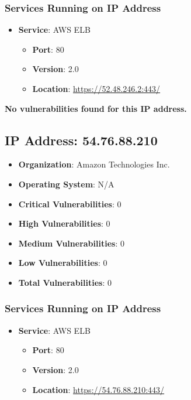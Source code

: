 \documentclass{article}
\begin{document}
\subsubsection*{Services Running on IP Address}

\begin{itemize}
    
        \item \textbf{Service}: AWS ELB
        \begin{itemize}
            \item \textbf{Port}: 80
            \item \textbf{Version}:  2.0 
            \item \textbf{Location}: \href{ https://52.48.246.2:443/ }{ https://52.48.246.2:443/ }
        \end{itemize}
    
\end{itemize}


\textbf{No vulnerabilities found for this IP address.}




\clearpage



\subsection{IP Address: 54.76.88.210}

\begin{itemize}
    \item \textbf{Organization}: Amazon Technologies Inc.
    \item \textbf{Operating System}:  N/A 
    \item \textbf{Critical Vulnerabilities}: 0
    \item \textbf{High Vulnerabilities}: 0
    \item \textbf{Medium Vulnerabilities}: 0
    \item \textbf{Low Vulnerabilities}: 0
    \item \textbf{Total Vulnerabilities}: 0
\end{itemize}

\subsubsection*{Services Running on IP Address}

\begin{itemize}
    
        \item \textbf{Service}: AWS ELB
        \begin{itemize}
            \item \textbf{Port}: 80
            \item \textbf{Version}:  2.0 
            \item \textbf{Location}: \href{ https://54.76.88.210:443/ }{ https://54.76.88.210:443/ }
        \end{itemize}
    
\end{itemize}
\end{document}

